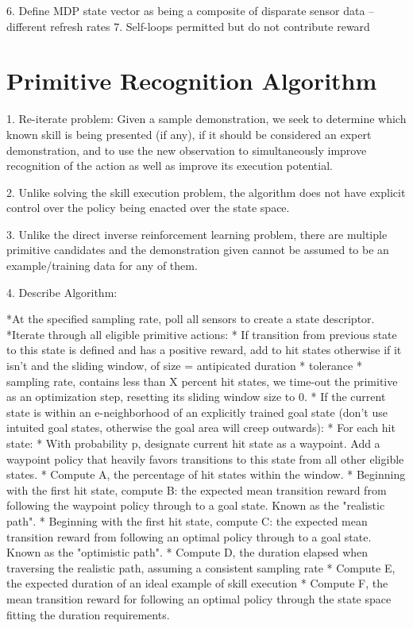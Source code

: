 \documentclass[letterpaper]{article}
\begin{document}
6. Define MDP state vector as being a composite of disparate sensor data -- different refresh rates
7. Self-loops permitted but do not contribute reward


\section{Primitive Recognition Algorithm}
\label{sec:recognition}
1. Re-iterate problem: Given a sample demonstration, we seek to determine which known skill is being presented (if any),
                       if it should be considered an expert demonstration, and to use the new observation to simultaneously
                       improve recognition of the action as well as improve its execution potential.

2. Unlike solving the skill execution problem, the algorithm does not have explicit control over the policy being enacted over the state space.

3. Unlike the direct inverse reinforcement learning problem, there are multiple primitive candidates and the demonstration given cannot be assumed to be an example/training data for any of them.

4. Describe Algorithm:

	*At the specified sampling rate, poll all sensors to create a state descriptor.
	*Iterate through all eligible primitive actions:
		* If transition from previous state to this state is defined and has a positive reward, add to hit states
		  otherwise if it isn't and the sliding window, of size = antipicated duration * tolerance * sampling rate, contains less
		  than X percent hit states, we time-out the primitive as an optimization step, resetting its sliding window size to 0.
		* If the current state is within an e-neighborhood of an explicitly trained goal state (don't use intuited goal states,
		  otherwise the goal area will creep outwards):
			* For each hit state:
				* With probability p, designate current hit state as a waypoint. Add a waypoint policy that heavily favors
				  transitions to this state from all other eligible states.
			* Compute A, the percentage of hit states within the window.
			* Beginning with the first hit state, compute B: the expected mean transition reward from following the waypoint policy through to a goal state. Known as the "realistic path".
			* Beginning with the first hit state, compute C: the expected mean transition reward from following an optimal policy through to a goal state. Known as the "optimistic path".
			* Compute D, the duration elapsed when traversing the realistic path, assuming a consistent sampling rate
			* Compute E, the expected duration of an ideal example of skill execution
			* Compute F, the mean transition reward for following an optimal policy through the state space fitting the duration requirements.
\end{document}
